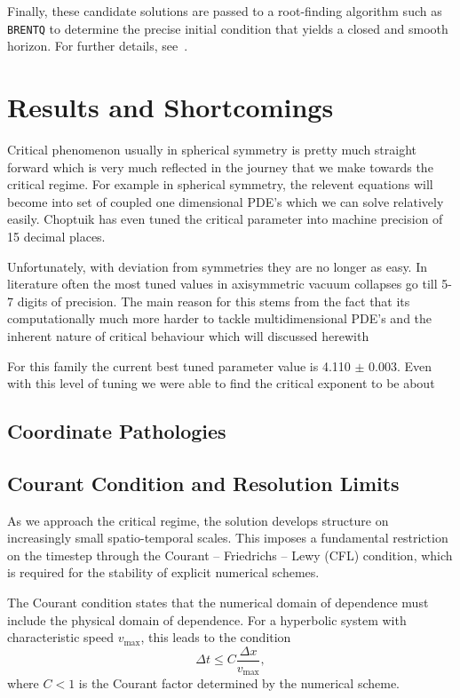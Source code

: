 \documentclass[11pt]{article}
\begin{document}
Finally, these candidate solutions are passed to a root-finding algorithm such as \texttt{BRENTQ} to determine the precise initial condition that yields a closed and smooth horizon. For further details, see~\cite{khirnov_2022}.


\section{Results and Shortcomings}

Critical phenomenon usually in spherical symmetry is pretty much straight forward which is very much reflected in the journey that we make towards the critical regime. For example in spherical symmetry, the relevent equations will become into set of coupled one dimensional PDE's which we can solve relatively easily. Choptuik has even tuned the critical parameter into machine precision of 15 decimal places.

Unfortunately, with deviation from symmetries they are no longer as easy. In literature often the most tuned values in axisymmetric vacuum collapses go till 5-7 digits of precision. The main reason for this stems from the fact that its computationally much more harder to tackle multidimensional PDE's and the inherent nature of critical behaviour which will discussed herewith

For this family the current best tuned parameter value is 4.110 $\pm$ 0.003. Even with this level of tuning we were able to find the critical exponent to be about 


\subsection{Coordinate Pathologies}


\subsection{Courant Condition and Resolution Limits}

As we approach the critical regime, the solution develops structure on increasingly small spatio-temporal scales. This imposes a fundamental restriction on the timestep through the Courant – Friedrichs – Lewy (CFL) condition, which is required for the stability of explicit numerical schemes.

The Courant condition states that the numerical domain of dependence must include the physical domain of dependence. For a hyperbolic system with characteristic speed $v_{\max}$, this leads to the condition
\[
\Delta t \leq C \frac{\Delta x}{v_{\max}},
\]
where $C < 1$ is the Courant factor determined by the numerical scheme.
\end{document}

